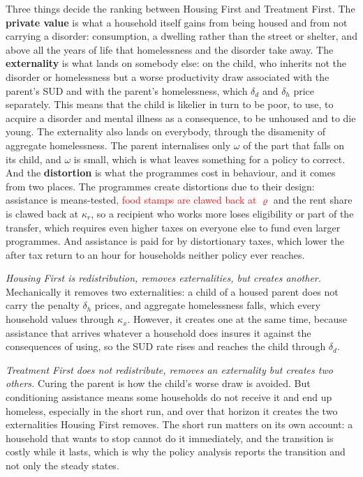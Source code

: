 \documentclass[10pt]{article}
\begin{document}
Three things decide the ranking between Housing First and Treatment
First. The \textbf{private value} is what a household
itself gains from being housed and from not carrying a disorder: consumption, a
dwelling rather than the street or shelter, and above all the years of life that
homelessness and the disorder take away. The \textbf{externality} is what
lands on somebody else: on the child, who inherits not the disorder
or homelessness but a
worse productivity draw associated with the parent's SUD
and with the parent's homelessness, which $\delta_d$ and $\delta_h$
price separately. This means that the child is
likelier in turn to be poor, to use, to acquire
a disorder and mental illness as a consequence, to be unhoused and to die young.
The externality also lands on everybody, through the disamenity of aggregate homelessness. The parent
internalises only $\omega$ of the part that falls on its child, and $\omega$ is
small, which is what leaves something for a policy to correct. And the
\textbf{distortion} is what the programmes cost in behaviour, and it comes from two
places. The programmes create distortions due to their design:
assistance is means-tested\textcolor{red}{, food stamps are clawed back at $\varrho$} and the rent share is clawed back at $\kappa_r$,
so a recipient who works more loses eligibility or part of the transfer, which requires
even higher taxes on everyone else to fund even larger programmes. And
assistance is paid for by
distortionary taxes, which lower the after tax return to an hour for households
neither policy ever reaches.

\emph{Housing First is redistribution, removes externalities, but
creates another.}
Mechanically it removes two externalities: a child of a housed parent does not
carry the penalty $\delta_h$ prices, and aggregate homelessness falls, which every
household values through $\kappa_x$. However, it creates one at the same time,
because assistance that arrives whatever a household does insures it against the
consequences of using, so the SUD rate rises and reaches the child through
$\delta_d$.

\emph{Treatment First does not redistribute, removes an
externality but creates two others.} Curing the parent is how the child's worse draw is avoided.
But conditioning assistance means some households do not receive it
and end up homeless, especially in the short run, and
over that horizon it creates the two externalities Housing First removes. The short
run matters on its own account: a household that wants to stop cannot do it
immediately, and the transition is costly while it lasts, which is why the
policy analysis reports the transition and not only the steady states.
\end{document}
